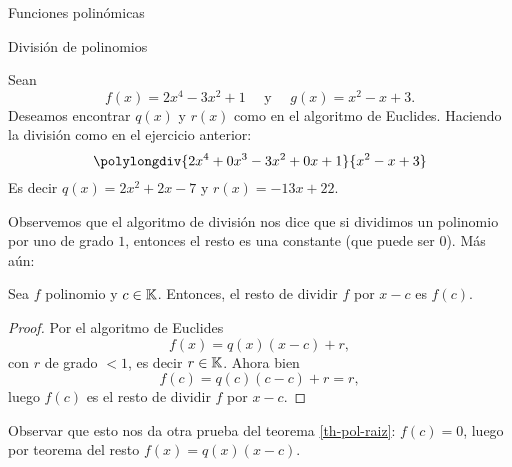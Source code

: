 \begin{chapter}{Funciones polinómicas}
\begin{section}{División de polinomios}
  \begin{ejemplo*}
      Sean
      \begin{equation*}
          f (x) = 2x^4 - 3x^2 + 1 \quad \text{ y } \quad g (x) = x^2 - x + 3.
      \end{equation*}
      Deseamos encontrar $q (x)$ y $r (x)$ como en el algoritmo de Euclides. Haciendo la división como en el ejercicio anterior:
      \begin{equation*}
          \polylongdiv{2x^4 +0x^3- 3x^2 +0x+ 1}{x^2 - x + 3}
      \end{equation*}
      Es decir $q(x) = 2x^2+2x-7$ y $r(x)= -13x+22$.
  \end{ejemplo*}

  Observemos que el algoritmo de división nos dice que si dividimos un polinomio por uno de grado $1$,  entonces el resto es una constante (que puede ser $0$). Más aún:

  \begin{teorema} Sea $f$ polinomio y $c \in \mathbb K$. Entonces,  el resto de dividir $f$ por $x-c$ es $f(c)$.
  \end{teorema}
  \begin{proof} Por  el algoritmo de Euclides
      \begin{equation*}
          f(x) = q(x)(x-c) + r,
      \end{equation*}
      con $r$ de grado $<1$,  es decir $r \in \mathbb K$.  Ahora bien
      \begin{equation*}
          f(c) = q(c)(c-c) + r = r,
      \end{equation*}
      luego $f(c)$  es el resto de dividir $f$ por $x-c$.
  \end{proof}

  Observar que esto  nos da otra prueba del teorema \ref{th-pol-raiz}: $f(c)=0$, luego por teorema del resto $ f(x)=q(x)(x-c)$.

 \end{section}

\end{chapter}

